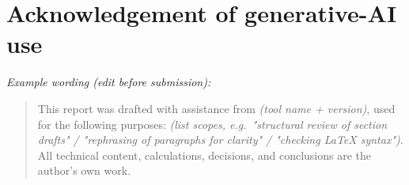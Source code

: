 
\section{Acknowledgement of generative-AI use}\label{sec:genai}


\textit{Example wording (edit before submission):}
\begin{quote}
\small
This report was drafted with assistance from \textit{(tool name + version)},
used for the following purposes: \textit{(list scopes, e.g.\ "structural
review of section drafts" / "rephrasing of paragraphs for clarity" /
"checking LaTeX syntax")}. All technical content, calculations,
decisions, and conclusions are the author's own work.
\end{quote}
